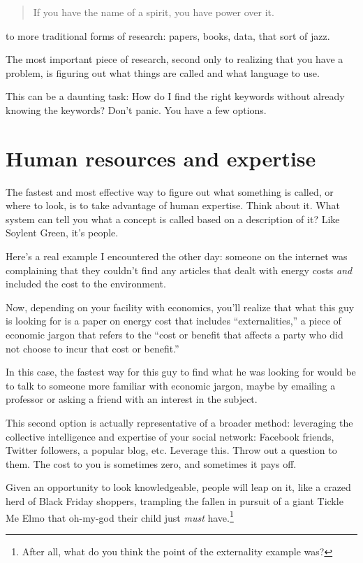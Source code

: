 \begin{quote}
  If you have the name of a spirit, you have power over it.
\end{quote}

 to more traditional forms of research: papers, books,
data, that sort of jazz.

The most important piece of research, second only to realizing that you have a
problem, is figuring out what things are called and what language to use.

This can be a daunting task: How do I find the right keywords without already
knowing the keywords? Don't panic. You have a few options.

\section{Human resources and expertise}

The fastest and most effective way to figure out what something is called, or
where to look, is to take advantage of human expertise. Think about it. What 
system can tell you what a concept is called based on a description of it? Like
Soylent Green, it's people.

Here's a real example I encountered the other day: someone on the internet was
complaining that they couldn't find any articles that dealt with energy
costs \textit{and} included the cost to the environment.

Now, depending on your facility with economics, you'll realize that what this
guy is looking for is a paper on energy cost that includes ``externalities,'' a
piece of economic jargon that refers to the ``cost or benefit that affects a
party who did not choose to incur that cost or benefit.''

In this case, the fastest way for this guy to find what he was looking for would
be to talk to someone more familiar with economic jargon, maybe by emailing a
professor or asking a friend with an interest in the subject.

This second option is actually representative of a broader method: leveraging the
collective intelligence and expertise of your social network: Facebook friends,
Twitter followers, a popular blog, etc. Leverage this. Throw out a question to
them. The cost to you is sometimes zero, and sometimes it pays off. 

Given an opportunity to look knowledgeable, people will leap on it, like a
crazed herd of Black Friday shoppers, trampling the fallen in pursuit of a giant Tickle Me Elmo that
oh-my-god their child just \textit{must} have.\footnote{After
  all, what do you think the point of the externality example was?}

